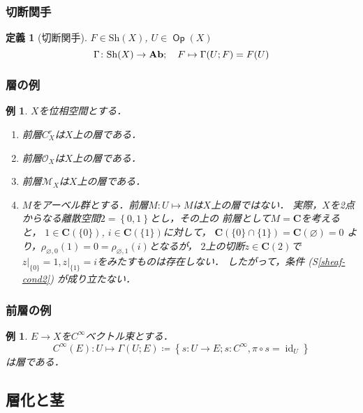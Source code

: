 \documentclass[dvipdfmx,12pt,aspectratio=169,leqno]{beamer}%
\newcommand{\cc}{\mathbf{C}}
\newcommand{\Ab}{{\bf Ab}}
\numberwithin{equation}{subsection}
\newcommand{\Op}{\mathop{\textsf{Op}}\nolimits}
\newcommand{\id}{\mathop{\mathrm{id}}\nolimits}
\newcommand{\Sh}{\mathrm{Sh}}
\theoremstyle{mystyle}
\newtheorem{DFN}[AXM]{定義}
\newtheorem{EG}[AXM]{例}
\begin{document}
\begin{frame}
    \frametitle{切断関手}

    \begin{DFN}[切断関手]
        \(F\in\Sh(X)\), \(U\in\Op(X)\)
        \[
            \Gamma\colon \Sh(X)\to \Ab;\quad F\mapsto
            \Gamma(U;F)=F(U)
        \]
    \end{DFN}    
\end{frame}



\begin{frame}
    \frametitle{層の例}
    \begin{EG}\label{eg:sheaf}
        \(X\)を位相空間とする．
        \begin{enumerate}
            \item 前層\(C_X^r\)は\(X\)上の層である．
            \item 前層\(\mathscr{O}_X\)は\(X\)上の層である．
            \item 前層\(\mathscr{M}_X\)は\(X\)上の層である．
            \item \(M\)をアーベル群とする．前層\(M\colon U\mapsto M\)は\(X\)上の層ではない．
            実際，\(X\)を2点からなる離散空間\(2=\left\{0,1\right\}\)とし，その上の
            前層として\(M=\cc\)を考えると，
            \(1\in\cc(\{0\})\), \(i\in\cc(\{1\})\)に対して，
            \(\cc(\{0\}\cap\{1\})=\cc(\varnothing)=0\)
            より，\(\rho_{\varnothing,{0}}(1)=0
            =\rho_{\varnothing,{1}}(i)\)となるが，
            \(2\)上の切断\(z\in\cc(2)\)で\(z\rvert_{\{0\}}=1,
            z\rvert_{\{1\}}=i\)をみたすものは存在しない．
            したがって，条件 (S\ref{sheaf-cond2}) が成り立たない．\label{eg:non-sheaf}
        \end{enumerate}
    \end{EG}    
\end{frame}

\begin{frame}
    \frametitle{前層の例}
    \begin{EG}
        \(E\to X\)を\(C^{\infty}\)ベクトル束とする．
        \[
            C^{\infty}(E)\colon U\mapsto \Gamma(U;E)\coloneqq
            \left\{s\colon U\to E;s\colon C^{\infty}, \pi\circ s=\id_U\right\}
        \]は層である．
    \end{EG}
\end{frame}


\subsection{層化と茎}
\end{document}
